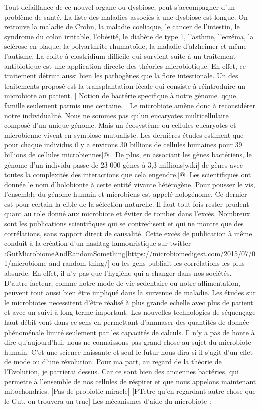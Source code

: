 \documentclass[12pt,a4paper]{article}
\begin{document}
Tout defaillance de ce nouvel organe ou dysbiose, peut s’accompagner d’un problème de santé. La liste des maladies associés à une dysbiose est longue. On retrouve la maladie de Crohn, la maladie coeliaque, le cancer de l’intestin, le syndrome du colon irritable, l’obésité, le diabète de type 1, l’asthme, l’eczéma, la sclérose en plaque, la polyarthrite rhumatoïde, la maladie d’alzheimer et même l’autisme.
La colite à clostridium difficile qui survient suite à un traitement antibiotique est une application directe des théories microbiotique. En effet, ce traitement détruit aussi bien les pathogènes que la flore intestionale. Un des traitements proposé est la transplantation fécale qui consiste à réintroduire un microbiote au patient.
[
Notion de bactérie specifique à notre génome.
qque famille seulement parmis une centaine.
]
Le microbiote amène donc à reconsidérer notre individualité. Nous ne sommes pas qu’un eucaryotes multicellulaire composé d’un unique génome. Mais un écosystème ou cellules eucaryotes et microbienne vivent en symbiose mutualiste. Les dernières études estiment que pour chaque individus il y a environs 30 billions de cellules humaines pour 39 billions de cellules microbiennes[@]. De plus, en associant les gènes bactériens, le génome d’un individu passe de 23 000 gènes à 3,3 millions[wiki] de gènes avec toutes la complexités des interactions que cela engendre.[@] Les scientifiques ont donnée le nom d’holobionte à cette entité vivante hétérogène. Pour pousser le vis, l’ensemble du génome humain et microbiens est appelé hologénome. Ce dernier est pour certain la cible de la sélection naturelle.
Il faut tout fois rester prudent quant au role donné aux microbiote et éviter de tomber dans l’excès. Nombreux sont les publications scientifiques qui se contredisent et qui ne montre que des corrélations, sans rapport direct de causalité. Cette excès de publication à même conduit à la création d’un hashtag humouristique sur twitter :GutMicrobiomeAndRandomSomething[https://microbiomedigest.com/2015/07/01/microbiome-and-random-thing/] ou les gens publiait les corrélations les plus absurde.
En effet, il n’y pas que l’hygiène qui a changer dans nos sociétés. D’autre facteur, comme notre mode de vie sedentaire ou notre allimentation, peuvent tout aussi bien être impliqué dans la survenue de maladie.
Les études sur le microbiotes necessitent d’être réalisé à plus grande echelle avec plus de patient et avec un suivi à long terme important. Les nouvelles technologies de séquençage haut débit vont dans ce sens en permettant d’ammaser des quantités de donnée phénoménale limité seulement par les capacités de calculs.
Il n’y a pas de honte à dire qu’aujourd’hui, nous ne connaissons pas grand chose au sujet du microbiote humain. C’et une science naissante et seul le futur nous dira si il s’agit d’un effet de mode ou d’une révolution.
Pour ma part, au regard de la théorie de l’Evolution, je parrierai dessus. Car ce sont bien des anciennes bactéries, qui permette à l’ensemble de nos cellules de réspirer et que nous appelons maintenant mitochondries.
[Pas de probiotic miracle]
[PTetre qu’en regardant autre chose que le Gut, on trouvera un truc]
Les mécanismes d’aide du microbiote :
\end{document}

